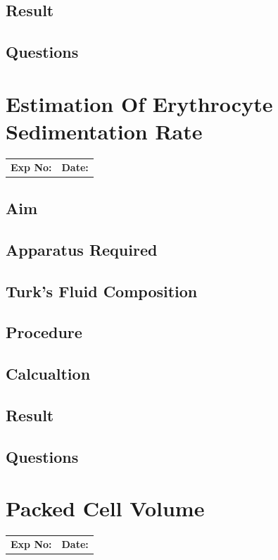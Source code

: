 \documentclass[a4paper,12pt]{book}
\begin{document}
					\section*{Result}
					\section*{Questions}

					\chapter*{\centering Estimation Of Erythrocyte Sedimentation Rate}
					\begin{tabular}{p{5in} p{1in}}
						\textbf{Exp No:}  & \textbf{Date:}\\
					\end{tabular}
					\section*{Aim}
					\section*{Apparatus Required}
					\section*{Turk's Fluid Composition}
					\section*{Procedure}
					\section*{Calcualtion}
					\section*{Result}
					\section*{Questions}


					\chapter*{\centering Packed Cell Volume}
					\begin{tabular}{p{5in} p{1in}}
						\textbf{Exp No:}  & \textbf{Date:}\\
					\end{tabular}
\end{document}
